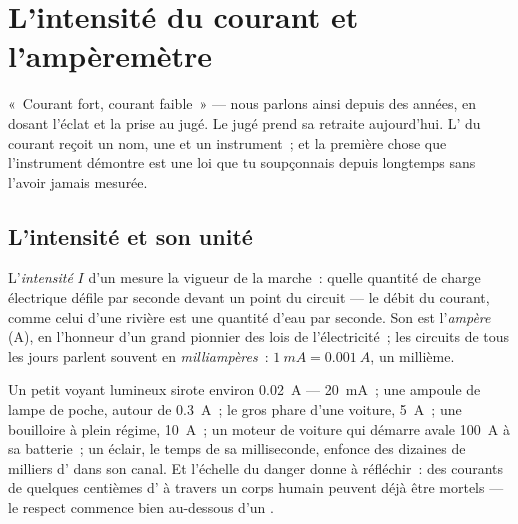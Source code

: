 \chapter{L'intensité du courant et l'ampèremètre}\label{ch:g8:intensity-ammeter}

«~Courant fort, courant faible~» --- nous parlons ainsi depuis des
années, en dosant l'éclat et la prise au jugé. Le jugé prend sa
retraite aujourd'hui. L' du courant reçoit un nom, une 
et un instrument~; et la première chose que l'instrument démontre est
une loi que tu soupçonnais depuis longtemps sans l'avoir jamais
mesurée.

\section{L'intensité et son unité}

\begin{definition}[Intensité]\label{def:g8:intensity-ammeter:intensity}
L'\emph{intensité} $I$ d'un 
mesure la vigueur de la marche~: quelle quantité de charge électrique
défile par seconde devant un point du circuit --- le débit du
courant, comme celui d'une rivière est une quantité d'eau par
seconde. Son  est l'\emph{ampère} (\unit{A}), en
l'honneur d'un grand pionnier des lois de l'électricité~; les
circuits de tous les jours parlent souvent en
\emph{milliampères}~: $\qty{1}{mA} = \qty{0.001}{A}$, un
millième.
\end{definition}

\begin{example}\label{ex:g8:intensity-ammeter:values}
Un petit voyant lumineux sirote environ \qty{0.02}{A} ---
\qty{20}{mA}~; une ampoule de lampe de poche, autour de
\qty{0.3}{A}~; le gros phare d'une voiture, \qty{5}{A}~; une
bouilloire à plein régime, \qty{10}{A}~; un moteur de voiture qui
démarre avale \qty{100}{A} à sa batterie~; un éclair, le temps de sa
milliseconde, enfonce des dizaines de milliers d' dans son
canal. Et l'échelle du danger donne à réfléchir~: des courants de
quelques centièmes d' à travers un corps humain peuvent déjà
être mortels --- le respect commence bien au-dessous d'un .
\end{example}

